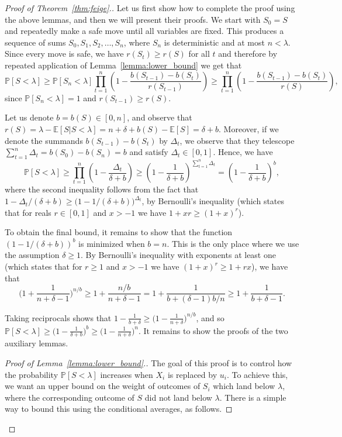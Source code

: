 \documentclass[10pt]{article}
\newcommand{\bE}{\mathbb{E}}
\newcommand{\Pb}{\mathbb P}
\begin{document}
\begin{proof}[Proof of Theorem~\ref{thm:feige}.]
Let us first show how to complete the proof using the above lemmas, and then we will present their proofs. We start with $S_0=S$ and repeatedly make a safe move until all variables are fixed. This produces a sequence of sums $S_0, S_1, S_2, \dots, S_n$, where $S_n$ is deterministic and at most $n<\lambda$. Since every move is safe, we have $r(S_t)\geq r(S)$ for all $t$ and therefore by repeated application of Lemma~\ref{lemma:lower_bound} we get that
\vspace{-0.1cm}
\[\Pb[S<\lambda]\ge \Pb[S_n<\lambda] \prod_{t=1}^n\left(1-\frac{b(S_{t-1})-b(S_{t})}{r(S_{t-1})}\right)\geq \prod_{t=1}^n\left(1-\frac{b(S_{t-1})-b(S_{t})}{r(S)}\right),\]
since $\Pb[S_n<\lambda]=1$ and $r(S_{t-1})\geq r(S)$. 

Let us denote $b=b(S)\in [0, n]$, and observe that $r(S)=\lambda-\bE[S|S<\lambda]=n+\delta+b(S)-\bE[S]=\delta+b$. Moreover, if we denote the summands $b(S_{t-1})-b(S_t)$ by $\Delta_t$, we observe that they telescope $\sum_{t=1}^n\Delta_t=b(S_0)-b(S_n)=b$ and satisfy $\Delta_t\in [0, 1]$. Hence, we have
\vspace{-0.1cm}
\[\Pb[S<\lambda]\ge \prod_{t=1}^n\left(1-\frac{\Delta_t}{\delta+b}\right)\ge \left(1-\frac{1}{\delta+b}\right)^{\sum_{t=1}^{n}\Delta_t}=\left(1-\frac{1}{\delta+b}\right)^{b},\]
where the second inequality follows from the fact that $1-\Delta_t/(\delta+b)\geq \big(1-1/(\delta+b)\big)^{\Delta_t}$, by Bernoulli's inequality (which states that for reals $r\in [0, 1]$ and $x>-1$ we have $1+xr\geq (1+x)^r$).

To obtain the final bound, it remains to show that the function $(1-1/(\delta+b))^b$ is minimized when $b=n$. This is the only place where we use the assumption $\delta\geq 1$. By Bernoulli's inequality with exponents at least one (which states that for $r\geq 1$ and $x>-1$ we have $(1+x)^r\geq 1+rx$), we have that 
\vspace{-0.1cm}
\[\Big(1+\frac{1}{n+\delta-1}\Big)^{n/b}\geq 1+\frac{n/b}{n+\delta-1}= 1+\frac{1}{b+(\delta-1)b/n}\geq 1+\frac{1}{b+\delta-1}.\]
\vspace{-0.5cm}

\noindent
Taking reciprocals shows that $1-\frac{1}{b+\delta}\geq \big(1-\frac{1}{n+\delta}\big)^{n/b}$, and so $\Pb[S<\lambda]\geq \Big(1-\frac{1}{\delta+b}\Big)^{b}\geq \Big(1-\frac{1}{n+\delta}\Big)^n$. It remains to show the proofs of the two auxiliary lemmas.

\begin{proof}[Proof of Lemma~\ref{lemma:lower_bound}.]
The goal of this proof is to control how the probability $\Pb[S<\lambda]$ increases when $X_i$ is replaced by $u_i$. To achieve this, we want an upper bound on the weight of outcomes of $S_i$ which land below $\lambda$, where the corresponding outcome of $S$ did not land below $\lambda$. There is a simple way to bound this using the conditional averages, as follows. 


\end{proof}
\end{proof}
\end{document}
